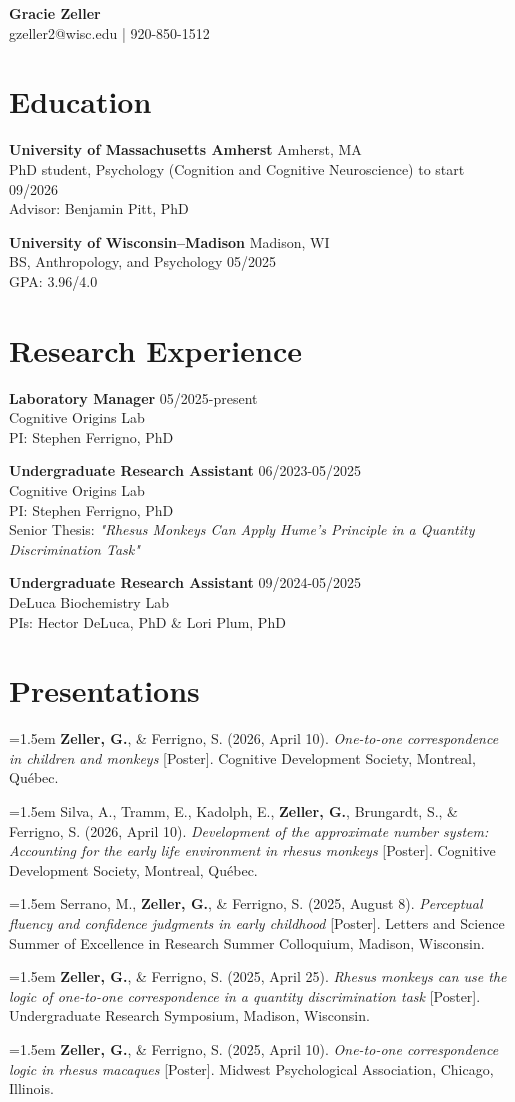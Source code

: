 \documentclass[10pt]{article}
\newcommand{\cventry}[1]{\hangindent=1.5em\hangafter=1 #1\par\medskip}
\newcommand{\cvsep}{\par\medskip}
\begin{document}
\begin{center}
    {\LARGE \textbf{Gracie Zeller}} \\
    gzeller2@wisc.edu | 920-850-1512
\end{center}
\vspace{0.1in}
\section*{Education}
\textbf{University of Massachusetts Amherst} \hfill Amherst, MA \\
PhD student, Psychology (Cognition and Cognitive Neuroscience) \hfill to start 09/2026 \\
Advisor: Benjamin Pitt, PhD
\cvsep
\textbf{University of Wisconsin–Madison} \hfill Madison, WI \\
BS, Anthropology, and Psychology \hfill 05/2025 \\
GPA: 3.96/4.0
\section*{Research Experience}
\textbf{Laboratory Manager} \hfill 05/2025-present \\
Cognitive Origins Lab \\
PI: Stephen Ferrigno, PhD
\cvsep
\textbf{Undergraduate Research Assistant} \hfill 06/2023-05/2025 \\
Cognitive Origins Lab \\
PI: Stephen Ferrigno, PhD \\
Senior Thesis: \textit{"Rhesus Monkeys Can Apply Hume's Principle in a Quantity Discrimination Task"}
\cvsep
\textbf{Undergraduate Research Assistant} \hfill 09/2024-05/2025 \\
DeLuca Biochemistry Lab \\
PIs: Hector DeLuca, PhD \& Lori Plum, PhD
\section*{Presentations}
\cventry{\textbf{Zeller, G.}, \& Ferrigno, S. (2026, April 10). \textit{One-to-one correspondence in children and monkeys} [Poster]. Cognitive Development Society, Montreal, Québec.}
\cventry{Silva, A., Tramm, E., Kadolph, E., \textbf{Zeller, G.}, Brungardt, S., \& Ferrigno, S. (2026, April 10). \textit{Development of the approximate number system: Accounting for the early life environment in rhesus monkeys} [Poster]. Cognitive Development Society, Montreal, Québec.}
\cventry{Serrano, M., \textbf{Zeller, G.}, \& Ferrigno, S. (2025, August 8). \textit{Perceptual fluency and confidence judgments in early childhood} [Poster]. Letters and Science Summer of Excellence in Research Summer Colloquium, Madison, Wisconsin.}
\cventry{\textbf{Zeller, G.}, \& Ferrigno, S. (2025, April 25). \textit{Rhesus monkeys can use the logic of one-to-one correspondence in a quantity discrimination task} [Poster]. Undergraduate Research Symposium, Madison, Wisconsin.}
\cventry{\textbf{Zeller, G.}, \& Ferrigno, S. (2025, April 10). \textit{One-to-one correspondence logic in rhesus macaques} [Poster]. Midwest Psychological Association, Chicago, Illinois.}
\end{document}
